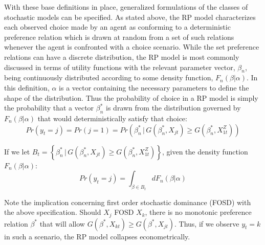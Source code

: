 \documentclass[11pt,a4paper]{report}
\newcommand\Prob{\ensuremath{\mathit{Pr}}}  %
\begin{document}
With these base definitions in place, generalized formulations of the classes of stochastic models can be specified.
As stated above, the RP model characterizes each observed choice made by an agent as conforming to a deterministic preference relation which is drawn at random from a set of such relations whenever the agent is confronted with a choice scenario.
While the set preference relations can have a discrete distribution, the RP model is most commonly discussed in terms of utility functions with the relevant parameter vector, $\beta_n$, being continuously distributed according to some density function, $F_n(\beta | \alpha)$.
In this definition, $\alpha$ is a vector containing the necessary parameters to define the shape of the distribution.
Thus the probability of choice in a RP model is simply the probability that a vector $\beta_n^*$ is drawn from the distribution governed by $F_n(\beta | \alpha)$ that would deterministically satisfy that choice:
\begin{equation}
	\label{eq2:RP0}
	{\Prob}(y_t=j) = {\Prob}(j=1) = {\Prob}\left( \beta_n^* \,|\, G(\beta_n^*,X_{jt}) \geq G(\beta_n^*,X_{1t}^Z)\right)
\end{equation}

\noindent If we let $ B_t = \left\{ \beta_n^* \,|\, G(\beta_n^*,X_{jt}) \geq G(\beta_n^*,X_{1t}^Z)\right\}$, given the density function $F_n(\beta | \alpha)$:
\begin{equation}
	\label{eq2:RP.f}
	{\Prob}(y_t=j) = \int_{\beta \in B_t} dF_n(\beta|\alpha)
\end{equation}

Note the implication concerning first order stochastic dominance (FOSD){\footnotemark} with the above specification. Should $X_j$ FOSD $X_k$, there is no monotonic preference relation $\beta^*$ that will allow $G(\beta^*,X_{kt}) \geq G(\beta^*,X_{jt})$.
Thus, if we observe $y_t = k$ in such a scenario, the RP model collapses econometrically.

\addtocounter{footnote}{-1}
\end{document}
